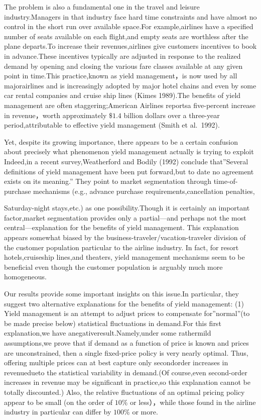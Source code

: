 The problem is also a fundamental one in the travel and leisure
industry.Managers in that industry face hard time constraints and have
almost no control in the short run over available space.For
example,airlines have a specified number of seats available on each
flight,and empty seats are worthless after the plane departs.To increase
their revenues,airlines give customers incentives to book in
advance.These incentives typically are adjusted in response to the
realized demand by opening and closing the various fare classes
available at any given point in time.This practice,known as yield
management，is now used by all majorairlines and is increasingly adopted
by major hotel chains and even by some car rental companies and cruise
ship lines (Kimes 1989).The benefits of yield management are often
staggering;American Airlines reportsa five-percent increase in
revenue，worth approximately \(\$ 1.4\) billion dollars over a
three-year period,attributable to effective yield management (Smith et
al.~1992).

Yet, despite its growing importance, there appears to be a certain
confusion about precisely what phenomenon yield management actually is
trying to exploit Indeed,in a recent survey,Weatherford and Bodily
(1992) conclude that''Several definitions of yield management have been
put forward,but to date no agreement exists on its meaning.'' They point
to market segmentation through time-of-purchase mechanisms (e.g.,
advance purchase requirements,cancellation penalties,

Saturday-night stays,etc.) as one possibility.Though it is certainly an
important factor,market segmentation provides only a partial---and
perhaps not the most central---explanation for the benefits of yield
management. This explanation appears somewhat biased by the
business-traveler/vacation-traveler division of the customer population
particular to the airline industry. In fact, for resort
hotels,cruiseship lines,and theaters, yield management mechanisms seem
to be beneficial even though the customer population is arguably much
more homogeneous.

Our results provide some important insights on this issue.In particular,
they suggest two alternative explanations for the benefits of yield
management: (1) Yield management is an attempt to adjust prices to
compensate for''normal''(to be made precise below) statistical
fluctuations in demand.For this first explanation,we have
anegativeresult.Namely,under some rathermild assumptions,we prove that
if demand as a function of price is known and prices are unconstrained,
then a single fixed-price policy is very nearly optimal. Thus, offering
multiple prices can at best capture only secondorder increases in
revenuedueto the statistical variability in demand.(Of course,even
second-order increases in revenue may be significant in practice,so this
explanation cannot be totally discounted.) Also, the relative
fluctuations of an optimal pricing policy appear to be small (on the
order of \(1 0 \%\) or less），while those found in the airline industry
in particular can differ by \(1 0 0 \%\) or more.

